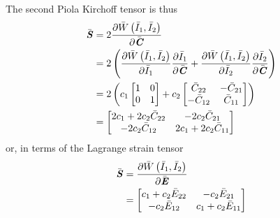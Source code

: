 The second Piola Kirchoff tensor is thus
\begin{equation}
  \begin{split}
    \bar{\boldsymbol{\mathit{S}}}&=2 \dfrac{\partial  \bar{W}\left( \bar{I}_{1},\bar{I}_{2} \right) }{\partial \bar{\boldsymbol{\mathit{C}}}} \\
    &=2\left(  \dfrac{\partial  \bar{W}\left( \bar{I}_{1},\bar{I}_{2} \right) }{\partial \bar{I}_{1}}  \dfrac{\partial \bar{I}_{1}}{\partial \bar{\boldsymbol{\mathit{C}}}} + \dfrac{\partial  \bar{W}\left( \bar{I}_{1},\bar{I}_{2} \right) }{\partial \bar{I}_{2}}  \dfrac{\partial \bar{I}_{2}}{\partial \bar{\boldsymbol{\mathit{C}}}}  \right)\\
    &=2\left( c_{1}\begin{bmatrix}
        1 & 0 \\
        0 & 1
    \end{bmatrix}+c_{2}\begin{bmatrix}
        \bar{C}_{22} & -\bar{C}_{21} \\
        -\bar{C}_{12} & \bar{C}_{11}
    \end{bmatrix} \right) \\
    &=\begin{bmatrix}
        2c_{1}+2c_{2}\bar{C}_{22} & -2c_{2}\bar{C}_{21} \\
        -2c_{2}\bar{C}_{12} & 2c_{1}+2c_{2}\bar{C}_{11}
    \end{bmatrix}
  \end{split}
\end{equation}
or, in terms of the Lagrange strain tensor
\begin{equation}
  \begin{split}
    \bar{\boldsymbol{\mathit{S}}}&= \dfrac{\partial  \bar{W}\left( \bar{I}_{1},\bar{I}_{2} \right) }{\partial \bar{\boldsymbol{\mathit{E}}}} \\
    &=\begin{bmatrix}
    c_{1}+c_{2}\bar{E}_{22} & -c_{2}\bar{E}_{21} \\
    -c_{2}\bar{E}_{12} & c_{1}+c_{2}\bar{E}_{11}
    \end{bmatrix}
  \end{split}
\end{equation}

